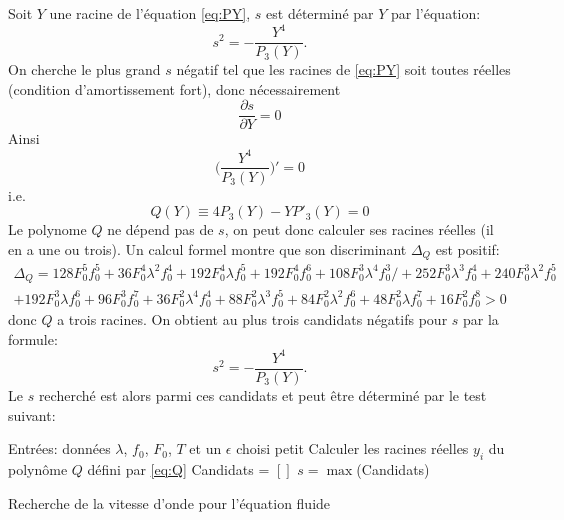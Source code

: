 \documentclass[11pt]{article}
\begin{document}
Soit $Y$ une racine de l'équation \ref{eq:PY}, $s$ est déterminé par $Y$ par l'équation: \begin{equation}
	s^2 = -\frac{Y^4}{P_3(Y)}. \label{eq:sfromY}
\end{equation} 
On cherche le plus grand $s$ négatif tel que les racines de \ref{eq:PY} soit toutes réelles (condition d'amortissement fort), donc nécessairement \begin{equation}
	\frac{\partial s}{\partial Y}=0
\end{equation}
Ainsi \begin{equation}
	\Big(\frac{Y^4}{P_3(Y)}\Big)'=0
\end{equation} 
i.e. \begin{equation}
\label{eq:Q}	Q(Y)\equiv4P_3(Y)-YP'_3(Y)=0
\end{equation}
Le polynome $Q$ ne dépend pas de $s$, on peut donc calculer ses racines réelles (il en a une ou trois). Un calcul formel montre que son discriminant $\Delta _Q$ est positif: \begin{multline*}
\Delta _Q = 128F_0^5f_0^5 + 36 F_0^4 \lambda^2 f_0^4 + 192 F_0^4 \lambda f_0^5 + 192 F_0^4 f_0^6 + 108 F_0^3 \lambda^4 f_0^3 /+ 252 F_0^3 \lambda^3 f_0^4 + 240 F_0^3 \lambda^2 f_0^5 \\+ 192 F_0^3 \lambda f_0^6 + 96 F_0^3 f_0^7 + 36 F_0^2 \lambda^4 f_0^4 + 88 F_0^2 \lambda^3 f_0^5 + 84 F_0^2 \lambda^2 f_0^6 + 48 F_0^2 \lambda f_0^7 + 16 F_0^2 f_0^8 > 0
\end{multline*} donc $Q$ a trois racines.
On obtient au plus trois candidats négatifs pour $s$ par la formule: \begin{equation*}
	s^2 = -\frac{Y^4}{P_3(Y)}.
\end{equation*}
Le $s$ recherché est alors parmi ces candidats et peut être déterminé par le test suivant: \\

\begin{algorithm}[H]
\SetAlgoLined
{}
 Entrées: données $\lambda$, $f_0$, $F_0$, $T$ et un $\epsilon$ choisi petit\;
 Calculer les racines réelles $y_i$ du polynôme $Q$ défini par \ref{eq:Q}\; 
 Candidats = $[]$\;
 $s= \max$(Candidats)
 \caption{Recherche de la vitesse d'onde pour l’équation fluide}
\end{algorithm}
 \ifdefined\COMPLETE
\else
\end{document}
